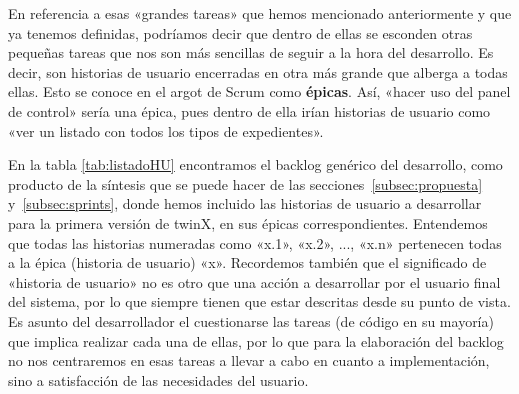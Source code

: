En referencia a esas «grandes tareas» que hemos mencionado anteriormente y que ya tenemos definidas, podríamos decir que dentro de ellas se esconden otras pequeñas tareas que nos son más sencillas de seguir a la hora del desarrollo. Es decir, son historias de usuario encerradas en otra más grande que alberga a todas ellas. Esto se conoce en el argot de Scrum como \textbf{épicas}. Así, «hacer uso del panel de control» sería una épica, pues dentro de ella irían historias de usuario como «ver un listado con todos los tipos de expedientes».

En la tabla \ref{tab:listadoHU} encontramos el backlog genérico del desarrollo, como producto de la síntesis que se puede hacer de las secciones~\ref{subsec:propuesta} y~\ref{subsec:sprints}, donde hemos incluido las historias de usuario a desarrollar para la primera versión de twinX, en sus épicas correspondientes. Entendemos que todas las historias numeradas como «x.1», «x.2», ..., «x.n» pertenecen todas a la épica (historia de usuario) «x». Recordemos también que el significado de «historia de usuario» no es otro que una acción a desarrollar por el usuario final del sistema, por lo que siempre tienen que estar descritas desde su punto de vista. Es asunto del desarrollador el cuestionarse las tareas (de código en su mayoría) que implica realizar cada una de ellas, por lo que para la elaboración del backlog no nos centraremos en esas tareas a llevar a cabo en cuanto a implementación, sino a satisfacción de las necesidades del usuario.

